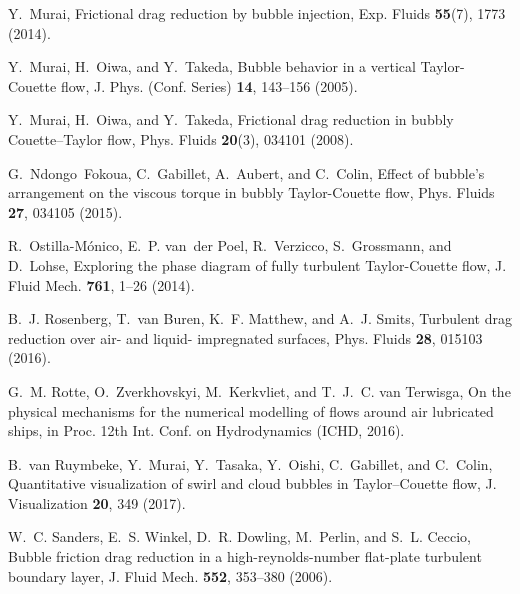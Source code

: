 \documentclass[aps,onecolumn,10pt, floatfix, superscriptaddress,longbibliography, pra]{revtex4-1}
\begin{document}
\begin{thebibliography}{44}
Y.~Murai, {Frictional drag reduction by bubble injection}, Exp. Fluids
  \textbf{55}(7), 1773 (2014).

Y.~Murai, H.~Oiwa, and Y.~Takeda, Bubble behavior in a vertical
  {{Taylor-Couette}} flow, J. Phys. (Conf. Series) \textbf{14}, 143--156
  (2005).

Y.~Murai, H.~Oiwa, and Y.~Takeda, Frictional drag reduction in bubbly
  {Couette--Taylor} flow, {Phys. Fluids} \textbf{20}(3), 034101 (2008).

G.~Ndongo~Fokoua, C.~Gabillet, A.~Aubert, and C.~Colin, Effect of bubble's
  arrangement on the viscous torque in bubbly {Taylor-Couette} flow, {Phys.
  Fluids} \textbf{27}, 034105 (2015).

R.~Ostilla-M\'onico, E.~P. van~der Poel, R.~Verzicco, S.~Grossmann, and
  D.~Lohse, Exploring the phase diagram of fully turbulent {{Taylor-Couette}}
  flow, J. Fluid Mech. \textbf{761}, 1--26 (2014).

B.~J. Rosenberg, T.~van Buren, K.~F. Matthew, and A.~J. Smits, Turbulent drag
  reduction over air- and liquid- impregnated surfaces, {Phys. Fluids}
  \textbf{28}, 015103 (2016).

G.~M. Rotte, O.~Zverkhovskyi, M.~Kerkvliet, and T.~J.~C. van Terwisga, On the
  physical mechanisms for the numerical modelling of flows around air
  lubricated ships, in {Proc. 12th Int. Conf. on Hydrodynamics} (ICHD, 2016).

B.~van Ruymbeke, Y.~Murai, Y.~Tasaka, Y.~Oishi, C.~Gabillet, and C.~Colin,
  Quantitative visualization of swirl and cloud bubbles in {Taylor--Couette}
  flow, {J. Visualization} \textbf{20}, 349 (2017).

W.~C. Sanders, E.~S. Winkel, D.~R. Dowling, M.~Perlin, and S.~L. Ceccio, Bubble
  friction drag reduction in a high-reynolds-number flat-plate turbulent
  boundary layer, J. Fluid Mech. \textbf{552}, 353--380 (2006).


\end{thebibliography}
\end{document}
